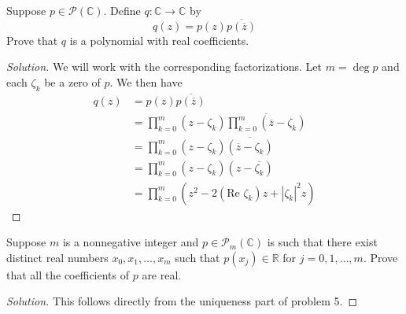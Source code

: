 \documentclass[12pt]{article}
\newenvironment{problem}[2][Problem]{\begin{trivlist}
\item[\hskip \labelsep {\bfseries #1}\hskip \labelsep {\bfseries #2.}]}{\end{trivlist}}
\newcommand{\conj}[1]{\overline{#1}}
\newenvironment{solution}
  {\renewcommand\qedsymbol{$\blacksquare$}\begin{proof}[Solution]}
{\end{proof}}
\begin{document}
\begin{problem}{9}
  Suppose $p\in \mathcal{P}(\mathbb{C})$. Define $q:\mathbb{C}\to\mathbb{C}$ by
  \begin{equation*}
    q(z)=p(z)\conj{p(\conj{z})}
  \end{equation*}
  Prove that $q$ is a polynomial with real coefficients.
\end{problem}
\begin{solution}
  We will work with the corresponding factorizations.
  Let $m=\deg p$ and each $\zeta_k$ be a zero of $p$.
  We then have
  \begin{align*}
    q(z) &= p(z)\conj{p(\conj{z})}\\
    &= \prod_{k=0}^{m}(z-\zeta_k)\conj{\prod_{k=0}^{m}(\conj{z}-\zeta_k)}\\
    &= \prod_{k=0}^{m}(z-\zeta_k)\conj{(\conj{z}-\zeta_k)}\\
    &= \prod_{k=0}^{m}(z-\zeta_k)(z-\conj{\zeta_k})\\
    &= \prod_{k=0}^{m}(z^2 - 2(\text{Re } \zeta_k)z + |\zeta_k|^2z)
  \end{align*}
\end{solution}
\begin{problem}{10}
  Suppose $m$ is a nonnegative integer and $p\in\mathcal{P}_m(\mathbb{C})$ is such that there exist
  distinct real numbers $x_0,x_1,\dots,x_m$ such that $p(x_j)\in\mathbb{R}$ for $j=0,1,\dots,m$.
  Prove that all the coefficients of $p$ are real.
\end{problem}
\begin{solution}
  This follows directly from the uniqueness part of problem 5.
\end{solution}
\begin{problem}{11}
  
\end{problem}
\end{document}
